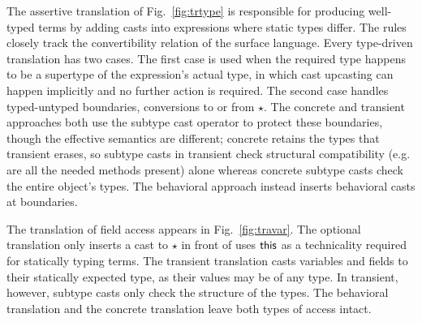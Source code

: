 \documentclass[a4paper,USenglish]{lipics-v2018}
\newcommand{\EM}[1]{\ensuremath{#1}\xspace}
\newcommand{\xt}[1]{{\sf{#1}}}
\newcommand{\EMxt}[1]{\EM{\xt{#1}}}
\newcommand{\any}{\EM{\star}}
\newcommand{\this}{\EMxt{this}}
\newcommand{\figref}[1]{Fig.~\ref{#1}\xspace}
\newcounter{rules}
\newcounter{conds}
\newcounter{cond}[conds]
\begin{document}
The assertive translation of \figref{fig:trtype} is responsible for producing
well-typed terms by adding casts into expressions where static types differ.
The rules closely track the convertibility relation of the surface language.
Every type-driven translation has two cases. The first case is used when the
required type happens to be a supertype of the expression's actual type, in
which cast upcasting can happen implicitly and no further action is required.
The second case handles typed-untyped boundaries, conversions to or from \any.
The concrete and transient approaches both use the subtype cast operator to
protect these boundaries, though the effective semantics are different; concrete
retains the types that transient erases, so subtype casts in transient check
structural compatibility (e.g. are all the needed methods present) alone
whereas concrete subtype casts check the entire object's types.
The behavioral approach instead inserts behavioral casts
at boundaries.

\enlargethispage{1.5\baselineskip}
The translation of field access appears in \figref{fig:travar}. The
optional translation only inserts a cast to \any in front of uses 
\this as a technicality required for statically typing terms. The
transient translation casts variables and fields to their statically
expected type, as their values may be of any type. In transient, however,
subtype casts only check the structure of the types. The behavioral
translation and the concrete translation leave both types of access intact.
\end{document}

